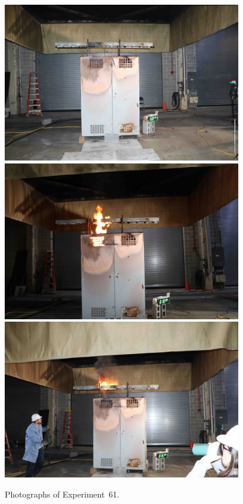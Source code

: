 \begin{figure}[p]
\centering
\includegraphics[height=2.75in]{../FIGURES/Test_61_setup} \\
\includegraphics[height=2.75in]{../FIGURES/Test_61_10_min_28_s} \\
\includegraphics[height=2.75in]{../FIGURES/Test_61_15_min_34_s}
\caption[Photographs of Experiment~61]{Photographs of Experiment~61.}
\label{fig:Test_61_photos}
\end{figure}


\clearpage

